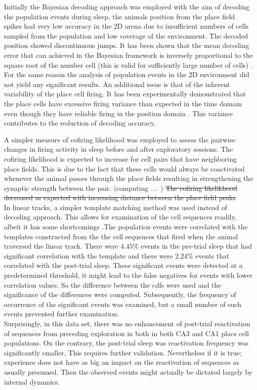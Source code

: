 Initially the Bayesian decoding approach was employed with the aim of decoding the population events during sleep, the animals position from the place field spikes had very low accuracy in the 2D arena due to insufficient numbers of cells sampled from the population and low coverage of the environment. The decoded position showed discontinuous jumps. It has been shown that the mean decoding error that can achieved in the Bayesian framework is inversely proportional to the square root of the number cell (this is valid for sufficiently large number of cells) \cite{Zhang2013}. For the same reason the analysis of population events in the 2D environment did not yield any significant results. An additional issue is that of the inherent variability of the place cell firing. It has been experimentally demonstrated that the place cells have excessive firing variance than expected in the time domain even though they have reliable firing in the position domain \cite{Fenton1998}. This variance contributes to the reduction of decoding accuracy.  

A simpler measure of cofiring likelihood was employed to assess the pairwise changes in firing activity in sleep before and after exploratory sessions. The cofiring likelihood is expected to increase for cell pairs that have neighboring place fields. This is due to the fact that these cells would always be coactivated whenever the animal passes through the place fields resulting in strengthening the synaptic strength between the pair. (computing .... ) 
\st{The cofiring likelikhood decreased as expected with increasing distance between the place field peaks }\\

In linear tracks, a simpler template matching method was used instead of decoding approach. This allows for examination of the cell sequences readily, albeit it has some shortcomings \cite{Tatsuno2006}.The population events were correlated with the templates constructed from the the cell sequences that fired when the animal traversed the linear track. There were $4.45 \% $ events in the pre-trial sleep that had significant correlation with the template and there were $ 2.24 \% $  events that correlated with the post-trial sleep. These significant events were detected at a predetermined threshold, it might lead to the false negatives for events with lower correlation values. So the difference between the cdfs were used and the significance of the differences were computed. Subsequently, the frequency of occurrence of the significant events was examined, but a small number of such events prevented further examination.\\ Surprisingly, in this data set, there was no enhancement of post-trial reactivation of sequences from preceding exploration in both in both CA3 and CA1 place cell populations. On the contrary, the post-trial sleep was reactivation frequency was significantly smaller, This requires further validation. Nevertheless if it is true; experience does not have as big an impact on the reactivation of sequences as usually presumed. Then the observed events might actually be dictated largely by internal dynamics. 

